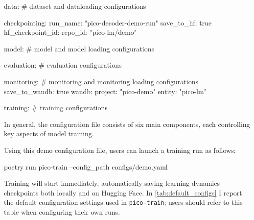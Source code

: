 \begin{center}
    \begin{configlisting}
        data:
            # dataset and dataloading configurations

        checkpointing:
            run_name: "pico-decoder-demo-run"
            save_to_hf: true
            hf_checkpoint_id:
                repo_id: "pico-lm/demo"
        
        model:
            # model and model loading configurations

        evaluation:
            # evaluation configurations

        monitoring:
            # monitoring and monitoring loading configurations
            save_to_wandb: true
            wandb:
                project: "pico-demo"
                entity: "pico-lm"
            
        training:
            # training configurations
    \end{configlisting}
\end{center}

In general, the configuration file consists of six main components, each controlling key aspects of model training. 

Using this demo configuration file, users can launch a training run as follows:

\begin{center}
    \begin{codelisting}
        poetry run pico-train --config_path configs/demo.yaml
    \end{codelisting}
\end{center}

Training will start immediately, automatically saving learning dynamics checkpoints both locally and on Hugging Face. In \cref{tab:default_configs} I report the default configuration settings used in \texttt{pico-train}; users should refer to this table when configuring their own runs.

